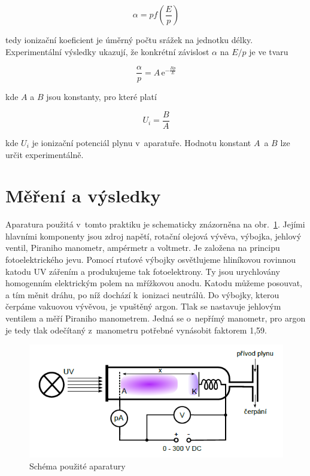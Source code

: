 \documentclass[a4paper,12pt]{article}
\newcommand{\e}{\text{e}}
\begin{document}
\begin{equation}
	\alpha = p f \left( \frac {E}{p} \right) 
	\label{4}
\end{equation}

tedy ionizační koeficient je úměrný počtu srážek na jednotku délky. Experimentální výsledky ukazují, že konkrétní závislost $\alpha$ na $E/p$ je ve tvaru

\begin{equation}
	\frac{\alpha}{p} = A\,\e^{-\frac{Bp}{E}} 
	\label{5}
\end{equation}

kde $A$ a $B$ jsou konstanty, pro které platí

\begin{equation}
	U_i = \frac{B}{A}
	\label{6}
\end{equation}

kde $U_i$ je ionizační potenciál plynu v~aparatuře. Hodnotu konstant $A$~a $B$ 
lze určit experimentálně.

\section{Měření a výsledky}

Aparatura použitá v~tomto praktiku je schematicky znázorněna na 
obr.~\ref{aparatura}. Jejími hlavními komponenty jsou zdroj napětí, rotační 
olejová vývěva, výbojka, jehlový ventil, Piraniho manometr, ampérmetr a 
voltmetr. Je založena na principu fotoelektrického jevu. Pomocí rtuťové výbojky 
osvětlujeme hliníkovou rovinnou katodu UV zářením a produkujeme tak 
fotoelektrony. Ty jsou urychlovány homogenním elektrickým polem na mřížkovou 
anodu. Katodu můžeme posouvat, a tím měnit dráhu, po níž dochází k~ionizaci 
neutrálů. Do výbojky, kterou čerpáme vakuovou vývěvou, je vpuštěný argon. Tlak 
se nastavuje jehlovým ventilem a měří Piraniho manometrem. Jedná se o~nepřímý 
manometr, pro argon je tedy tlak odečítaný z~manometru potřebné vynásobit 
faktorem 1,59.

\begin{figure}[h]
	\centering
	\includegraphics[width=130mm]{aparatura.png}
	\caption{Schéma použité aparatury}
	\label{aparatura}
\end{figure}
\end{document}
